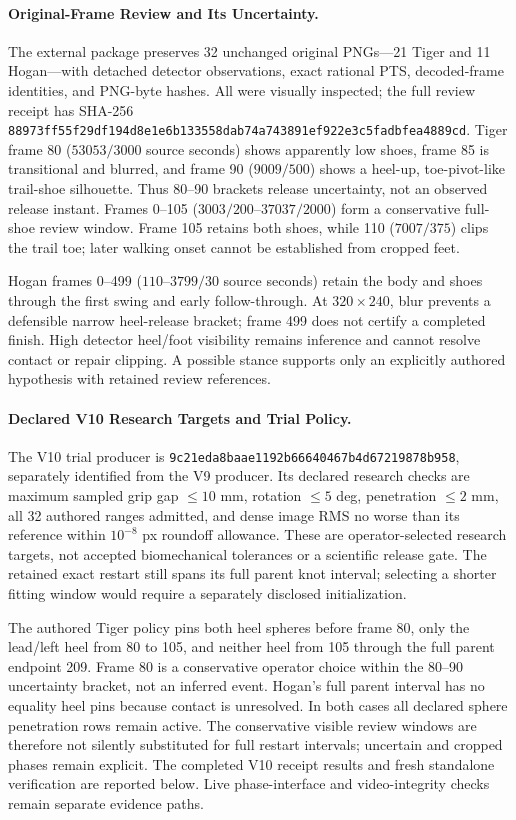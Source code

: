 \documentclass[11pt,letterpaper]{article}
\newcommand{\hash}[1]{{\footnotesize\nolinkurl{#1}}}
\begin{document}
\paragraph{Original-Frame Review and Its Uncertainty.}
The external  package preserves 32 unchanged
original PNGs---21 Tiger and 11 Hogan---with detached detector observations,
exact rational PTS, decoded-frame identities, and PNG-byte hashes. All were
visually inspected; the full review receipt has SHA-256
\hash{88973ff55f29df194d8e1e6b133558dab74a743891ef922e3c5fadbfea4889cd}.
Tiger frame 80 ($53053/3000$ source seconds) shows apparently low shoes,
frame 85 is transitional and blurred, and frame 90 ($9009/500$) shows a
heel-up, toe-pivot-like trail-shoe silhouette. Thus 80--90 brackets release
uncertainty, not an observed release instant. Frames 0--105
($3003/200$--$37037/2000$) form a conservative full-shoe review window.
Frame 105 retains both shoes, while 110 ($7007/375$) clips the trail toe;
later walking onset cannot be established from cropped feet.

Hogan frames 0--499 ($110$--$3799/30$ source seconds) retain the body and shoes
through the first swing and early follow-through. At $320\times240$, blur
prevents a defensible narrow heel-release bracket; frame 499 does not certify
a completed finish. High detector heel/foot visibility remains inference and
cannot resolve contact or repair clipping. A possible stance supports only
an explicitly authored hypothesis with retained review references.

\paragraph{Declared V10 Research Targets and Trial Policy.}
The V10 trial producer is
\hash{9c21eda8baae1192b66640467b4d67219878b958}, separately identified from the
V9 producer. Its declared research checks are maximum sampled grip gap
$\leq10$ mm, rotation $\leq5$ deg, penetration $\leq2$ mm, all 32 authored
ranges admitted, and dense image RMS no worse than its reference within
$10^{-8}$ px roundoff allowance. These are operator-selected research targets,
not accepted biomechanical tolerances or a scientific release gate.
The retained exact restart still spans its full parent knot interval; selecting
a shorter fitting window would require a separately disclosed initialization.

The authored Tiger policy pins both heel spheres before frame 80, only the
lead/left heel from 80 to 105, and neither heel from 105 through the full
parent endpoint 209. Frame 80 is a conservative operator choice within the
80--90 uncertainty bracket, not an inferred event. Hogan's full parent
interval has no equality heel pins because contact is unresolved. In both
cases all declared sphere penetration rows remain active. The conservative
visible review windows are therefore not silently substituted for full
restart intervals; uncertain and cropped phases remain explicit.
The completed V10 receipt results and fresh standalone verification are
reported below. Live phase-interface and video-integrity checks remain
separate evidence paths.
\end{document}

